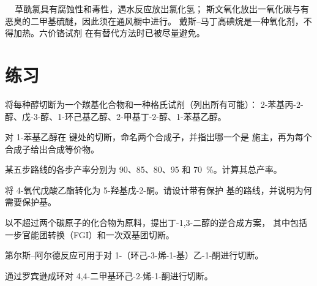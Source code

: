\begin{safety}{\,\,\,\,\,}
草酰氯具有腐蚀性和毒性，遇水反应放出氯化氢；
斯文氧化放出一氧化碳与有恶臭的二甲基硫醚，因此须在通风橱中进行。
戴斯–马丁高碘烷是一种氧化剂，不得加热。六价铬试剂
在有替代方法时已被尽量避免。
\end{safety}

\section{练习}

\begin{exercise}[$\star$]\label{exo:b2:retrosynthesis:1}
将每种醇切断为一个羰基化合物和一种格氏试剂（列出所有可能）：
2-苯基丙-2-醇、戊-3-醇、1-环己基乙醇、2-甲基丁-2-醇、1-苯基乙醇。
\end{exercise}

\begin{exercise}[$\star$]\label{exo:b2:retrosynthesis:2}
对 1-苯基乙醇在  键处的切断，命名两个合成子，并指出哪一个是
施主，再为每个合成子给出合成等价物。
\end{exercise}

\begin{exercise}[$\star$]\label{exo:b2:retrosynthesis:3}
某五步路线的各步产率分别为 90、85、80、95 和 70~\%。计算其总产率。
\end{exercise}

\begin{exercise}[$\star$]\label{exo:b2:retrosynthesis:4}
将 4-氧代戊酸乙酯转化为 5-羟基戊-2-酮。请设计带有保护
基的路线，并说明为何需要保护基。
\end{exercise}

\begin{exercise}[$\star\star$]\label{exo:b2:retrosynthesis:5}
以不超过两个碳原子的化合物为原料，提出丁-1,3-二醇的逆合成方案，
其中包括一步官能团转换（FGI）和一次双基团切断。
\end{exercise}

\begin{exercise}[$\star\star$]\label{exo:b2:retrosynthesis:6}
第尔斯–阿尔德反应可用于对 1-（环己-3-烯-1-基）乙-1-酮进行切断。
\end{exercise}

\begin{exercise}[$\star\star$]\label{exo:b2:retrosynthesis:7}
通过罗宾逊成环对 4,4-二甲基环己-2-烯-1-酮进行切断。
\end{exercise}

